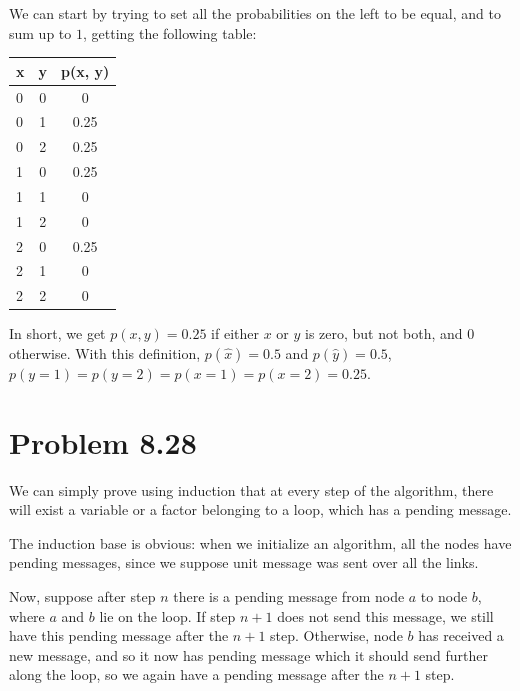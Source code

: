\documentclass[fleqn]{article}
\begin{document}
We can start by trying to set all the probabilities on the left to be equal, and to sum up to $1$, getting the following table:
\begin{table}[h]
	\begin{tabular}{| l | c | c|}
		\hline
		x  & y & p(x, y) \\\hline
		0 & 0 & 0  \\\hline
		0 & 1 & 0.25  \\\hline
		0 & 2 & 0.25  \\\hline
		1 & 0 & 0.25  \\\hline
		1 & 1 & 0  \\\hline
		1 & 2 & 0  \\\hline
		2 & 0 & 0.25  \\\hline
		2 & 1 & 0  \\\hline
		2 & 2 & 0  \\\hline
	\end{tabular}
\end{table}

In short, we get $p(x,y) = 0.25$ if either $x$ or $y$ is zero, but not both, and 0 otherwise. With this definition, $p(\hat x) = 0.5$ and $p(\hat y) = 0.5$, $p(y=1) = p(y=2) = p(x=1) = p(x=2) = 0.25$.


\section*{Problem 8.28}

We can simply prove using induction that at every step of the algorithm, there will exist a variable or a factor belonging to a loop, which has a pending message. 

The induction base is obvious: when we initialize an algorithm, all the nodes have pending messages, since we suppose unit message was sent over all the links. 

Now, suppose after step $n$ there is a pending message from node $a$ to node $b$, where $a$ and $b$ lie on the loop. If step $n+1$ does not send this message, we still have this pending message after the $n+1$ step. Otherwise, node $b$ has received a new message, and so it now has pending message which it should send further along the loop, so we again have a pending message after the $n+1$ step.
\end{document}
